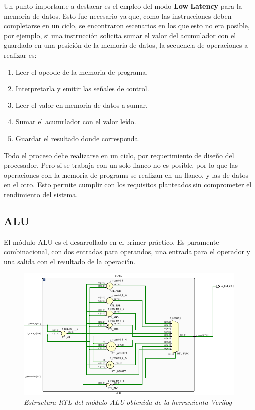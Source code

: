 \documentclass[12pt,A4paper,titlepage]{article}
\begin{document}
Un punto importante a destacar es el empleo del modo \textbf{Low Latency} para la memoria de datos. Esto fue necesario ya que, como las instrucciones deben completarse en un ciclo, se encontraron escenarios en los que esto no era posible, por ejemplo, si una instrucción solicita sumar el valor del acumulador con el guardado en una posición de la memoria de datos, la secuencia de operaciones a realizar es:
\begin{enumerate}
    \item Leer el opcode de la memoria de programa.
    \item Interpretarla y emitir las señales de control.
    \item Leer el valor en memoria de datos a sumar.
    \item Sumar el acumulador con el valor leído.
    \item Guardar el resultado donde corresponda.
\end{enumerate}

Todo el proceso debe realizarse en un ciclo, por requerimiento de diseño del procesador. Pero si se trabaja con un solo flanco no es posible, por lo que las operaciones con la memoria de programa se realizan en un flanco, y las de datos en el otro. Esto permite cumplir con los requisitos planteados sin comprometer el rendimiento del sistema.

\subsection{ALU}
El módulo ALU es el desarrollado en el primer práctico. Es puramente combinacional, con dos entradas para operandos, una entrada para el operador y una salida con el resultado de la operación.

\begin{figure}[h] 
	\centering
	\includegraphics[scale=0.6]{figure/rtl-alu.png}
	\caption{\textit{Estructura RTL del módulo ALU obtenida de la herramienta Verilog}}
\end{figure}
\end{document}
